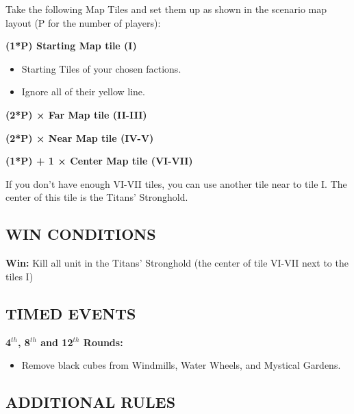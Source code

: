 \begin{multicols*}{2}
Take the following Map Tiles and set them up as shown in the scenario map layout (P for the number of players):

\textbf{(1*P) Starting Map tile (I)}
\begin{itemize}
    \item Starting Tiles of your chosen factions.
    \item Ignore all of their yellow line.
\end{itemize}

\textbf{(2*P) × Far Map tile (II-III)}

\textbf{(2*P) × Near Map tile (IV-V)}

\textbf{(1*P) + 1 × Center Map tile (VI-VII)}

If you don't have enough VI-VII tiles, you can use another tile near to tile I.
The center of this tile is the Titans' Stronghold.

\subsection*{\MakeUppercase{Win conditions}}

\textbf{Win:} Kill all unit in the Titans' Stronghold (the center of tile VI-VII next to the tiles I)

\subsection*{\MakeUppercase{Timed events}}

\textbf{4$^{th}$, 8$^{th}$ and 12$^{th}$ Rounds:}
\begin{itemize}
    \item Remove black cubes from Windmills, Water Wheels, and Mystical Gardens.
\end{itemize}

\end{multicols*}

\newpage

\subsection*{\MakeUppercase{Additional rules}}

